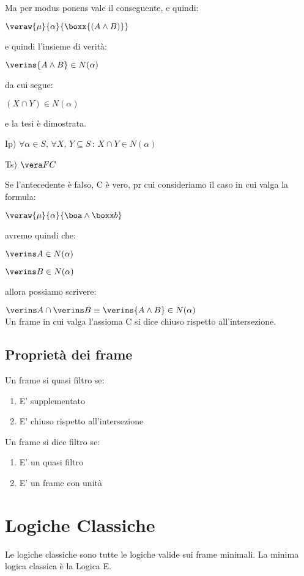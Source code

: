 Ma per modus ponens vale il conseguente, e quindi:

$\veraw{\mu}{\alpha}{\boxx{(A\wedge B)}}$

e quindi l'insieme di verità:

$\verins{A\wedge B}\in N(\alpha)$

da cui segue:

$(X\cap Y)\in N(\alpha)$

e la tesi è dimostrata.

Ip) $\forall\alpha\in S,\,\forall X,\, Y\subseteq S\,:\, X\cap Y\in N(\alpha)$

Ts) $\vera FC$ 

Se l'antecedente è falso, C è vero, pr cui consideriamo il caso in
cui valga la formula:

$\veraw{\mu}{\alpha}{\boa\wedge\boxx b}$

avremo quindi che:

$\verins A\in N(\alpha)$

$\verins B\in N(\alpha)$

allora possiamo scrivere:

$\verins A\cap\verins B\equiv\verins{A\wedge B}\in N(\alpha)$\\


Un frame in cui valga l'assioma C si dice chiuso rispetto all'intersezione.


\subsection{Proprietà dei frame}

Un frame si quasi filtro se:
\begin{enumerate}
\item E' supplementato
\item E' chiuso rispetto all'intersezione
\end{enumerate}
Un frame si dice filtro se:
\begin{enumerate}
\item E' un quasi filtro
\item E' un frame con unità
\end{enumerate}

\section{Logiche Classiche}

Le logiche classiche sono tutte le logiche valide sui frame minimali.
La minima logica classica è la Logica E.

